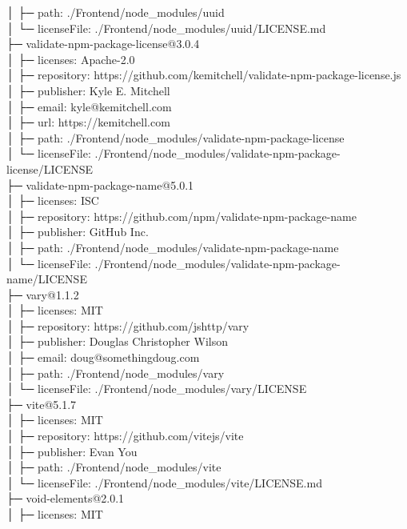 │  ├─ path: ./Frontend/node\_modules/uuid\\
│  └─ licenseFile: ./Frontend/node\_modules/uuid/LICENSE.md\\
├─ validate-npm-package-license@3.0.4\\
│  ├─ licenses: Apache-2.0\\
│  ├─ repository: https://github.com/kemitchell/validate-npm-package-license.js\\
│  ├─ publisher: Kyle E. Mitchell\\
│  ├─ email: kyle@kemitchell.com\\
│  ├─ url: https://kemitchell.com\\
│  ├─ path: ./Frontend/node\_modules/validate-npm-package-license\\
│  └─ licenseFile: ./Frontend/node\_modules/validate-npm-package-license/LICENSE\\
├─ validate-npm-package-name@5.0.1\\
│  ├─ licenses: ISC\\
│  ├─ repository: https://github.com/npm/validate-npm-package-name\\
│  ├─ publisher: GitHub Inc.\\
│  ├─ path: ./Frontend/node\_modules/validate-npm-package-name\\
│  └─ licenseFile: ./Frontend/node\_modules/validate-npm-package-name/LICENSE\\
├─ vary@1.1.2\\
│  ├─ licenses: MIT\\
│  ├─ repository: https://github.com/jshttp/vary\\
│  ├─ publisher: Douglas Christopher Wilson\\
│  ├─ email: doug@somethingdoug.com\\
│  ├─ path: ./Frontend/node\_modules/vary\\
│  └─ licenseFile: ./Frontend/node\_modules/vary/LICENSE\\
├─ vite@5.1.7\\
│  ├─ licenses: MIT\\
│  ├─ repository: https://github.com/vitejs/vite\\
│  ├─ publisher: Evan You\\
│  ├─ path: ./Frontend/node\_modules/vite\\
│  └─ licenseFile: ./Frontend/node\_modules/vite/LICENSE.md\\
├─ void-elements@2.0.1\\
│  ├─ licenses: MIT\\
